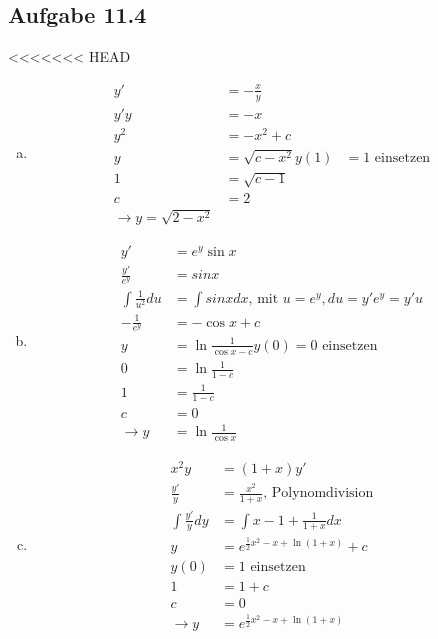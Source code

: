 \documentclass{standalone}
\begin{document}
\subsection{Aufgabe 11.4}
<<<<<<< HEAD
\begin{enumerate}[a)]
    \item \begin{align}
        y' &= -\frac{x}{y} \\
        y'y &= -x \\
        y^2 &= -x^2 + c \\
        y &= \sqrt{c-x^2}
        y(1) &= 1 \text{ einsetzen} \\
        1 &= \sqrt{c-1} \\
        c &= 2 \\
        \rightarrow y = \sqrt{2-x^2}
    \end{align}
    \item \begin{align}
        y' &= e^y\sin x \\
        \frac{y'}{e^y} &= sin x \\
        \int \frac{1}{u^2}du &= \int sin x dx \text{, mit } u = e^y, du = y'e^y = y'u \\
        -\frac{1}{e^y} &= -\cos x + c \\
        y &= \ln \frac{1}{\cos x - c}
        y(0) = 0 \text{ einsetzen} \\
        0 &= \ln \frac{1}{1-c} \\
        1 &= \frac{1}{1-c} \\
        c &= 0 \\
        \rightarrow y &= \ln \frac{1}{\cos x}
    \end{align}
    \item \begin{align}
        x^2 y &= (1+x)y' \\
        \frac{y'}{y} &= \frac{x^2}{1+x} \text{, Polynomdivision} \\
        \int \frac{y'}{y}dy &= \int x - 1 + \frac{1}{1+x}dx \\
        y &= e^{\frac{1}{2}x^2 - x + \ln (1+x)} + c \\
        y(0) &= 1 \text{ einsetzen} \\
        1 &= 1 + c\\
        c &= 0 \\
        \rightarrow y &= e^{\frac{1}{2}x^2 - x + \ln (1+x)}
    \end{align}
\end{enumerate}
\end{document}
